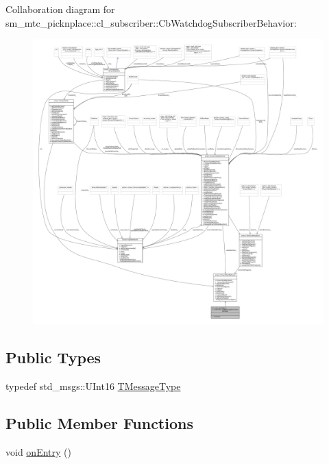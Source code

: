 Collaboration diagram for sm\+\_\+mtc\+\_\+picknplace\+:\+:cl\+\_\+subscriber\+:\+:Cb\+Watchdog\+Subscriber\+Behavior\+:
\nopagebreak
\begin{figure}[H]
\begin{center}
\leavevmode
\includegraphics[width=350pt]{classsm__mtc__picknplace_1_1cl__subscriber_1_1CbWatchdogSubscriberBehavior__coll__graph}
\end{center}
\end{figure}
\subsection*{Public Types}
\begin{DoxyCompactItemize}
\item 
typedef std\+\_\+msgs\+::\+U\+Int16 \hyperlink{classsm__mtc__picknplace_1_1cl__subscriber_1_1CbWatchdogSubscriberBehavior_a72608fc9ca08bb9c13b9ae0a62573a61}{T\+Message\+Type}
\end{DoxyCompactItemize}
\subsection*{Public Member Functions}
\begin{DoxyCompactItemize}
\item 
void \hyperlink{classsm__mtc__picknplace_1_1cl__subscriber_1_1CbWatchdogSubscriberBehavior_a759490e56551499076321aa0d639ab8e}{on\+Entry} ()
\end{DoxyCompactItemize}



